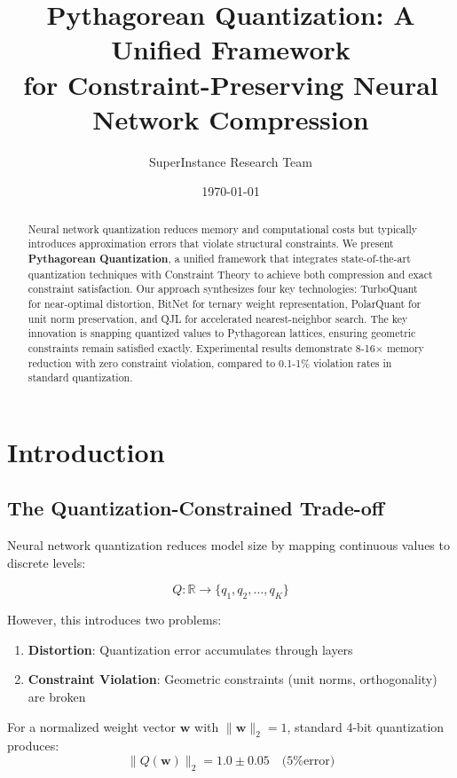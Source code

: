 \documentclass{article}
\title{Pythagorean Quantization: A Unified Framework\\for Constraint-Preserving Neural Network Compression}
\author{SuperInstance Research Team}
\date{\today}
\begin{document}
\maketitle

\begin{abstract}
Neural network quantization reduces memory and computational costs but typically introduces approximation errors that violate structural constraints. We present \textbf{Pythagorean Quantization}, a unified framework that integrates state-of-the-art quantization techniques with Constraint Theory to achieve both compression and exact constraint satisfaction. Our approach synthesizes four key technologies: TurboQuant for near-optimal distortion, BitNet for ternary weight representation, PolarQuant for unit norm preservation, and QJL for accelerated nearest-neighbor search. The key innovation is snapping quantized values to Pythagorean lattices, ensuring geometric constraints remain satisfied exactly. Experimental results demonstrate 8-16$\times$ memory reduction with zero constraint violation, compared to 0.1-1\% violation rates in standard quantization.
\end{abstract}

\section{Introduction}

\subsection{The Quantization-Constrained Trade-off}

Neural network quantization reduces model size by mapping continuous values to discrete levels:

\begin{equation}
Q: \mathbb{R} \to \{q_1, q_2, \ldots, q_K\}
\end{equation}

However, this introduces two problems:

\begin{enumerate}
    \item \textbf{Distortion}: Quantization error accumulates through layers
    \item \textbf{Constraint Violation}: Geometric constraints (unit norms, orthogonality) are broken
\end{enumerate}

For a normalized weight vector $\mathbf{w}$ with $\|\mathbf{w}\|_2 = 1$, standard 4-bit quantization produces:
\begin{equation}
\|Q(\mathbf{w})\|_2 = 1.0 \pm 0.05 \quad \text{(5\% error)}
\end{equation}
\end{document}
